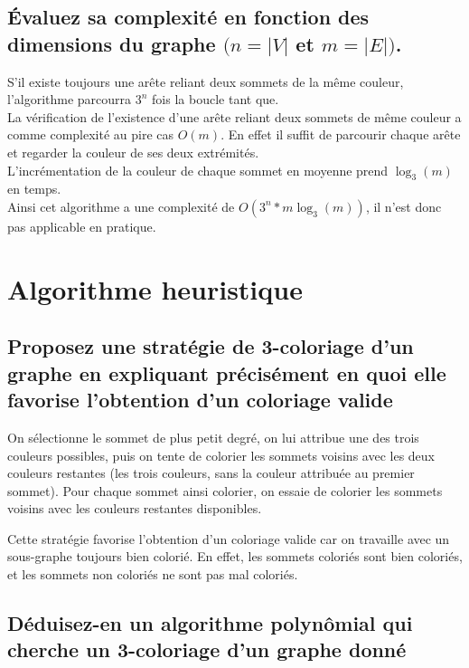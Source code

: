 \documentclass[a4paper, 11pt]{article}
\begin{document}
    \subsection{Évaluez sa complexité en fonction des dimensions du graphe $(n = |V| $ et $ m = |E|)$.}\label{subsec:Q2B}
    S'il existe toujours une arête reliant deux sommets de la même couleur, l'algorithme parcourra $3^n$ fois la boucle tant que.\\
    La vérification de l'existence d'une arête reliant deux sommets de même couleur a comme complexité au pire cas $O(m)$.
    En effet il suffit de parcourir chaque arête et regarder la couleur de ses deux extrémités.\\
    L'incrémentation de la couleur de chaque sommet en moyenne prend $\log_3(m)$ en temps.\\
    Ainsi cet algorithme a une complexité de $O(3^n*m\log_3(m))$, il n'est donc pas applicable en pratique.

    \newpage
    \section{Algorithme heuristique}\label{sec:algorithme-heuristique}

    \subsection{Proposez une stratégie de 3-coloriage d'un graphe
    en expliquant précisément en quoi elle favorise l'obtention d'un coloriage valide}\label{subsec:Q3A}
    On sélectionne le sommet de plus petit degré, on lui attribue une des trois couleurs possibles,
    puis on tente de colorier les sommets voisins avec les deux couleurs restantes (les trois couleurs, sans la couleur attribuée au premier sommet).
    Pour chaque sommet ainsi colorier, on essaie de colorier les sommets voisins avec les couleurs restantes disponibles.

    Cette stratégie favorise l'obtention d'un coloriage valide car on travaille avec un sous-graphe toujours bien colorié.
    En effet, les sommets coloriés sont bien coloriés, et les sommets non coloriés ne sont pas mal coloriés.

    \subsection{Déduisez-en un algorithme polynômial qui cherche un 3-coloriage d’un graphe donné}\label{subsec:Q3B}
\end{document}
